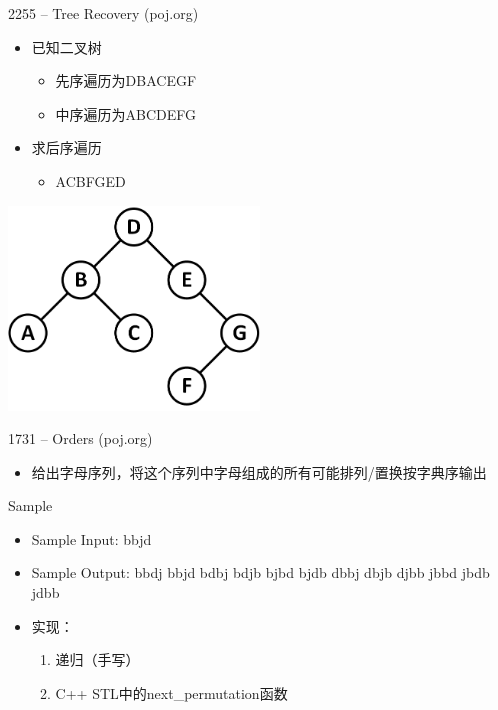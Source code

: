 \documentclass{beamer}
\begin{document}
\begin{frame}{2255 -- Tree Recovery (poj.org)}
    \begin{itemize}
        \item 已知二叉树
        \begin{itemize}
            \item 先序遍历为DBACEGF
            \item 中序遍历为ABCDEFG
        \end{itemize}
        \item 求后序遍历
        \begin{itemize}
            \item ACBFGED
        \end{itemize}
    \end{itemize}
    \includegraphics[width=0.5\textwidth, right]{fig/2-2.png}
\end{frame}
\begin{frame}{1731 -- Orders (poj.org)}
    \begin{itemize}
        \item 给出字母序列，将这个序列中字母组成的所有可能排列/置换按字典序输出
    \end{itemize}
    \vfill
    \begin{exampleblock}{Sample}
        \begin{itemize}
            \item Sample Input: bbjd
            \item Sample Output: bbdj bbjd bdbj bdjb bjbd bjdb dbbj dbjb djbb jbbd jbdb jdbb
        \end{itemize}
    \end{exampleblock}
    \vfill
    \begin{itemize}
        \item 实现：
        \begin{enumerate}
            \item 递归（手写）
            \item C++ STL中的next\_permutation函数
        \end{enumerate}
    \end{itemize}
\end{frame}
\end{document}
